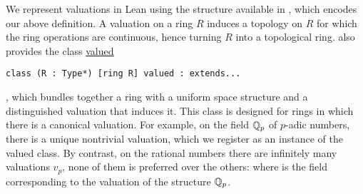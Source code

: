 \documentclass[sigplan,10pt,anonymous,review]{acmart}
\begin{document}
We represent valuations in Lean using the  structure \href{https://leanprover-community.github.io/mathlib_docs/ring_theory/valuation/basic.html#valuation}{\extlink}
 available in \mathlib, which encodes our above definition. A valuation on a ring $R$ induces a topology  on $R$ for which the ring operations are continuous, hence turning $R$ into a topological ring.
\mathlib also provides the class \href{https://leanprover-community.github.io/mathlib_docs/topology/algebra/valuation.html#valued}{valued}
\begin{lstlisting}
class (R : Type*) [ring R] valued : extends...
\end{lstlisting}
, which bundles together a ring with a
uniform space structure and a distinguished valuation that induces it. This class is designed for rings in which there is a canonical valuation. For example, on the field $\mathbb{Q}_p$ of $p$-adic numbers, there is a unique nontrivial valuation, which we register as an instance of the valued class. By contrast, on the rational numbers there are infinitely many valuations $v_p$,  none of them is preferred over the others: 
where  is the field corresponding to the valuation of the structure  $\mathbb{Q}_p$.
\end{document}
